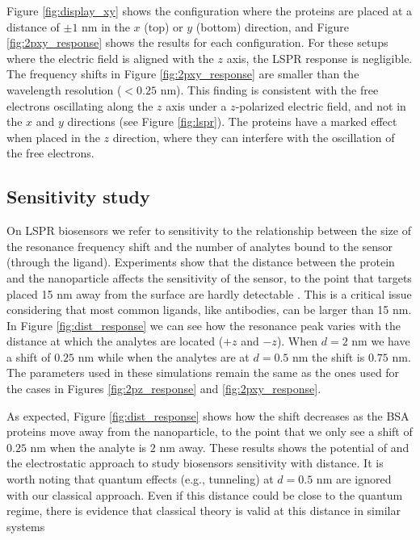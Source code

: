 Figure \ref{fig:display_xy} shows the configuration where the proteins are placed at a 
distance of $\pm 1$ nm in the $x$ (top) or $y$ (bottom) direction, and Figure \ref{fig:2pxy_response} 
shows the  results for each configuration. For these setups where the 
electric field is aligned with the $z$ axis, the LSPR response is negligible. The 
frequency shifts in Figure \ref{fig:2pxy_response} are smaller than the wavelength 
resolution ($<0.25$ nm). This finding is consistent with the free electrons oscillating
along the $z$ axis under a $z$-polarized electric field, and not in the $x$ and $y$ 
directions (see Figure \ref{fig:lspr}). The proteins have a marked effect when placed in the
$z$ direction, where they can interfere with the oscillation of the free electrons. 

\subsection{Sensitivity study} \label{sec:sensitivity}

On LSPR biosensors we refer to sensitivity to the relationship between the size of the 
resonance frequency shift and the number of analytes bound to the sensor (through the 
ligand). Experiments show that the distance between the protein and the nanoparticle 
affects the sensitivity of the sensor, to the point that targets placed 15 nm away 
from the surface are hardly detectable \cite{HaesETal2004}. This is a critical issue
considering that most common ligands, like antibodies, can be larger than 15 nm. In 
Figure \ref{fig:dist_response} we can see how the resonance peak varies with the distance 
at which the  analytes are located ($+z$ and $-z$). When $d=2$ nm we have a shift of 
$0.25$ nm while when the analytes are at $d=0.5$ nm the shift is $0.75$ nm. The parameters
used in these simulations remain the same as the ones used for the cases in Figures 
\ref{fig:2pz_response} and \ref{fig:2pxy_response}.

As expected, Figure \ref{fig:dist_response} shows how the shift decreases as the BSA 
proteins move away from the nanoparticle, to the point that we only see a shift of 
$0.25$ nm when the analyte is $2$ nm away. These results shows the potential of \pygbe 
and the electrostatic approach to study biosensors sensitivity with distance. It is 
worth noting that quantum effects (e.g., tunneling) at $d=0.5$ nm are ignored with 
our classical approach. Even if this distance could be close to the quantum regime, 
there is evidence that classical theory is valid at this distance in similar systems
\cite{SavageETal2012, EstebanETal2012}

